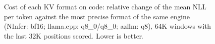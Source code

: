 \begin{figure}[t]
  \centering
  
  \caption{Cost of each KV format on code: relative change of the mean NLL per token against
           the most precise format of the same engine (NInfer: bf16; llama.cpp: q8\_0/q8\_0;
           azllm: q8), 64K windows with the last 32K positions scored. Lower is better.}
  \label{fig:kvppl}
\end{figure}
